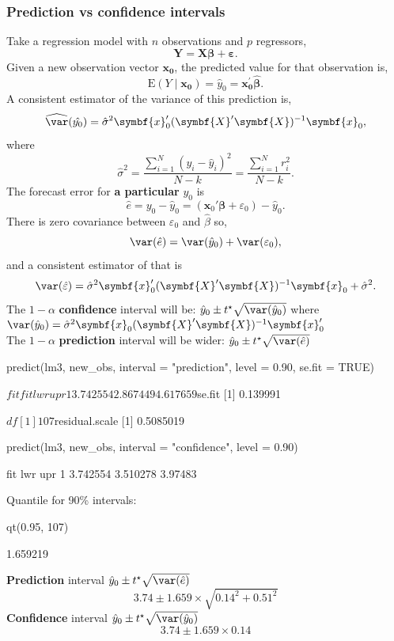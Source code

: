 \documentclass[a4paper]{article}\usepackage[]{graphicx}\usepackage[]{xcolor}
\begin{document}
\subsubsection{Prediction vs confidence intervals}
Take a regression model with \( n \) observations and \( p \) regressors,
\[
	\symbf{Y} = \symbf{X}\symbf{\beta} + \symbf{\varepsilon}.
\]
Given a new observation vector \( \symbf{x}_{\textbf{0}} \), the predicted value for that observation is,
\[
	\mathrm{E} (Y \mid \symbf{x}_{\textbf{0}}) = \hat{y}_0 = \symbf{x}_{\textbf{0}}^\prime \symbf{\hat{\beta}}.
\]
A consistent estimator of the variance of this prediction is,
\[
	\widehat{\var}(\hat{y_0}) = \hat{\sigma}^2 \symbf{x}_0'(\symbf{X}^\prime \symbf{X})^{-1}\symbf{x}_0,
\]
where
\[
	\hat{\sigma}^2=\frac{\sum_{i=1}^{N} (y_i-\hat{y}_i)^2}{N-k} = \frac{\sum_{i=1}^{N} r_i^2}{N-k}.
\]
The forecast error for \textbf{a particular} \( y_0 \) is
\[
	\hat{e} = y_0 - \hat{y}_0 = (\symbf{x}_0' \symbf{\beta} + \varepsilon_0) - \hat{y}_0.
\] 
There is zero covariance between \( \varepsilon_0 \) and \( \hat{\beta} \) so,
\[
	\var(\hat{e}) = \var(\hat{y}_0) + \var(\varepsilon_0),
\]
and a consistent estimator of that is
\[
	\var(\hat{\varepsilon}) = \hat{\sigma}^2 \symbf{x}_0^\prime (\symbf{X}^\prime \symbf{X})^{-1} \symbf{x}_0 + \hat{\sigma}^2.
\]
The \( 1-\alpha \) \textbf{confidence} interval will be: \( \hat{y}_0 \pm t^\star \sqrt{\var(\hat{y}_0)} \) where \( \var(\hat{y}_0) = \hat{\sigma}^2 \symbf{x}_0(\symbf{X}^\prime \symbf{X})^{-1}\symbf{x}_0^\prime \)\\
The \( 1-\alpha \) \textbf{prediction} interval will be wider: \( \hat{y}_0 \pm t^\star \sqrt{\var(\hat{e})} \) 
\begin{Schunk}
\begin{Sinput}
predict(lm3, new_obs, 
        interval = "prediction",
        level = 0.90, se.fit = TRUE)
\end{Sinput}
\begin{Soutput}
$fit
       fit      lwr      upr
1 3.742554 2.867449 4.617659

$se.fit
[1] 0.139991

$df
[1] 107

$residual.scale
[1] 0.5085019
\end{Soutput}
\begin{Sinput}
predict(lm3, new_obs, 
        interval = "confidence",
        level = 0.90)
\end{Sinput}
\begin{Soutput}
       fit      lwr     upr
1 3.742554 3.510278 3.97483
\end{Soutput}
\end{Schunk}
Quantile for 90\% intervals:
\begin{Schunk}
\begin{Sinput}
qt(0.95, 107)
\end{Sinput}
\begin{Soutput}
[1] 1.659219
\end{Soutput}
\end{Schunk}
\textbf{Prediction} interval \( \hat{y}_0 \pm t^\star \sqrt{\var(\hat{e})} \)
\[
	3.74 \pm 1.659 \times \sqrt{0.14^2 + 0.51^2}
\]
\textbf{Confidence} interval \( \hat{y}_0 \pm t^\star \sqrt{\var(\hat{y}_0)} \)
\[
	3.74 \pm 1.659 \times 0.14
\]
\end{document}
